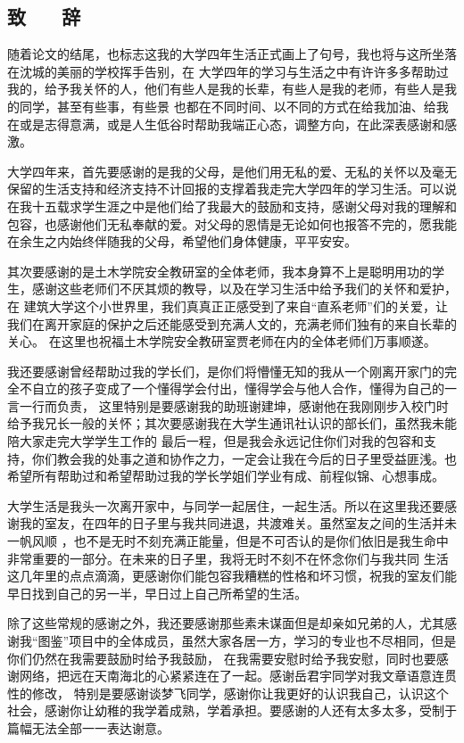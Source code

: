 \begin{center}
    \section*{  \textbf{致 ~~ 辞}}
    \end{center}

随着论文的结尾，也标志这我的大学四年生活正式画上了句号，我也将与这所坐落在沈城的美丽的学校挥手告别，在
大学四年的学习与生活之中有许许多多帮助过我的，给予我关怀的人，他们有些人是我的长辈，有些人是我的老师，有些人是我的同学，甚至有些事，有些景
也都在不同时间、以不同的方式在给我加油、给我在或是志得意满，或是人生低谷时帮助我端正心态，调整方向，在此深表感谢和感激。

大学四年来，首先要感谢的是我的父母，是他们用无私的爱、无私的关怀以及毫无保留的生活支持和经济支持不计回报的支撑着我走完大学四年的学习生活。可以说
在我十五载求学生涯之中是他们给了我最大的鼓励和支持，感谢父母对我的理解和包容，也感谢他们无私奉献的爱。对父母的恩情是无论如何也报答不完的，愿我能
在余生之内始终伴随我的父母，希望他们身体健康，平平安安。

其次要感谢的是土木学院安全教研室的全体老师，我本身算不上是聪明用功的学生，感谢这些老师们不厌其烦的教导，以及在学习生活中给予我们的关怀和爱护，在
建筑大学这个小世界里，我们真真正正感受到了来自“直系老师”们的关爱，让我们在离开家庭的保护之后还能感受到充满人文的，充满老师们独有的来自长辈的关心。
在这里也祝福土木学院安全教研室贾老师在内的全体老师们万事顺遂。

我还要感谢曾经帮助过我的学长们，是你们将懵懂无知的我从一个刚离开家门的完全不自立的孩子变成了一个懂得学会付出，懂得学会与他人合作，懂得为自己的一言一行而负责，
这里特别是要感谢我的助班谢建坤，感谢他在我刚刚步入校门时给予我兄长一般的关怀；其次要感谢我在大学生通讯社认识的部长们，虽然我未能陪大家走完大学学生工作的
最后一程，但是我会永远记住你们对我的包容和支持，你们教会我的处事之道和协作之力，一定会让我在今后的日子里受益匪浅。也希望所有帮助过和希望帮助过我的学长学姐们学业有成、前程似锦、心想事成。

大学生活是我头一次离开家中，与同学一起居住，一起生活。所以在这里我还要感谢我的室友，在四年的日子里与我共同进退，共渡难关。虽然室友之间的生活并未一帆风顺
，也不是无时不刻充满正能量，但是不可否认的是你们依旧是我生命中非常重要的一部分。在未来的日子里，我将无时不刻不在怀念你们与我共同
生活这几年里的点点滴滴，更感谢你们能包容我糟糕的性格和坏习惯，祝我的室友们能早日找到自己的另一半，早日过上自己所希望的生活。

除了这些常规的感谢之外，我还要感谢那些素未谋面但是却亲如兄弟的人，尤其感谢我“图鉴”项目中的全体成员，虽然大家各居一方，学习的专业也不尽相同，但是你们仍然在我需要鼓励时给予我鼓励，
在我需要安慰时给予我安慰，同时也要感谢网络，把远在天南海北的心紧紧连在了一起。感谢岳君宇同学对我文章语意连贯性的修改，
特别是要感谢谈梦飞同学，感谢你让我更好的认识我自己，认识这个社会，感谢你让幼稚的我学着成熟，学着承担。要感谢的人还有太多太多，受制于篇幅无法全部一一表达谢意。

